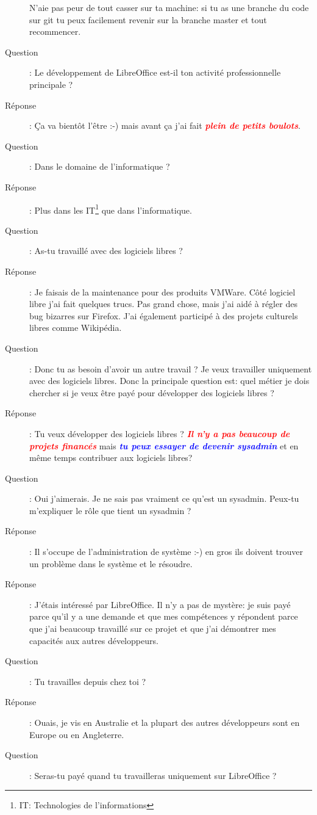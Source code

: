 \documentclass[a4paper,12pt, draft]{report}
\newcommand{\badPoint}[1]{\textcolor{red}{\textbf{\textit{#1}}}}
\newcommand{\importantPoint}[1]{\textcolor{blue}{\textbf{\textit{#1}}}}
\begin{document}
\begin{description}
N'aie pas peur de tout casser sur ta machine: si tu as une branche du code sur git tu peux facilement revenir sur la branche master et tout recommencer.
\item [Question]:  Le développement de LibreOffice est-il ton activité professionnelle principale ?
\item [Réponse]:  Ça va bientôt l'être :-) mais avant ça j'ai fait \badPoint{plein de petits boulots}.
\item [Question]:  Dans le domaine de l'informatique ?
\item [Réponse]:  Plus dans les IT\footnote{\textsc{IT}: Technologies de l'informations} que dans l'informatique.
\item [Question]:  As-tu travaillé avec des logiciels libres ?
\item [Réponse]:  Je faisais de la maintenance pour des produits VMWare. Côté logiciel libre j'ai fait quelques trucs. Pas grand chose, mais j'ai aidé à régler des bug bizarres sur Firefox. J'ai également participé à des projets culturels libres comme Wikipédia.
\item [Question]:  Donc tu as besoin d'avoir un autre travail ? Je veux travailler uniquement avec des logiciels libres. Donc la principale question est: quel métier je dois chercher si je veux être payé pour développer des logiciels libres ?
\item [Réponse]:  Tu veux développer des logiciels libres ? \badPoint{Il n'y a pas beaucoup de projets financés} mais \importantPoint{tu peux essayer de devenir sysadmin} et en même temps contribuer aux logiciels libres?
\item [Question]:  Oui j'aimerais. Je ne sais pas vraiment ce qu'est un sysadmin. Peux-tu m'expliquer le rôle que tient un sysadmin ?
\item [Réponse]:  Il s'occupe de l'administration de système :-) en gros ils doivent trouver un problème dans le système et le résoudre.
\item [Réponse]:  J'étais intéressé par LibreOffice. Il n'y a pas de mystère: je suis payé parce qu'il y a une demande et que mes compétences y répondent parce que j'ai beaucoup travaillé sur ce projet et que j'ai démontrer mes capacités aux autres développeurs.
\item [Question]:  Tu travailles depuis chez toi ?
\item [Réponse]:  Ouais, je vis en Australie et la plupart des autres développeurs sont en Europe ou en Angleterre.
\item [Question]:  Seras-tu payé quand tu travailleras uniquement sur LibreOffice ?

\end{description}
\end{document}
